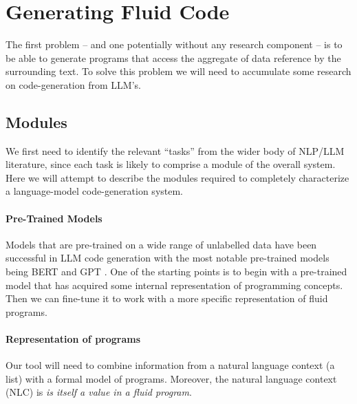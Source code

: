 \section{Generating Fluid Code}
\label{sec:generate-fluid}

The first problem -- and one potentially without any research component -- is to be able
to generate  programs that access the aggregate of data reference by the surrounding text.
To solve this problem we will need to accumulate some research on code-generation from LLM's.

\subsection{Modules}
We first need to identify the relevant ``tasks'' from the wider body of NLP/LLM literature,
since each task is likely to comprise a module of the overall system. Here we will attempt
to describe the modules required to completely characterize a language-model code-generation
system.

\paragraph*{Pre-Trained Models}
Models that are pre-trained on a wide range of unlabelled data have been successful in LLM
code generation with the most notable pre-trained models being BERT \citep{devlin2019}
and GPT \citep{radford2018}. One of the starting points is to begin with a pre-trained model
that has acquired some internal representation of programming concepts. Then we can fine-tune
it to work with a more specific representation of fluid programs.

\paragraph*{Representation of  programs}
Our tool will need to combine information from a natural language context (a  list)
with a formal model of  programs. Moreover, the natural language context (NLC) is
\textit{is itself a value in a fluid program}. 

